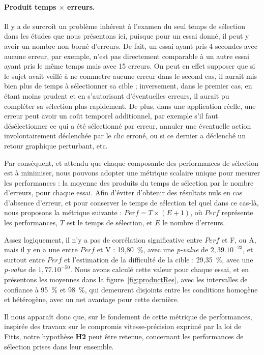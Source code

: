 	\paragraph{Produit temps $\times$ erreurs.}
	Il y a de surcroît un problème inhérent à l'examen du seul temps de sélection dans les études que nous présentons ici, puisque pour un essai donné, il peut y avoir un nombre non borné d'erreurs. De fait, un essai ayant pris 4 secondes avec aucune erreur, par exemple, n'est pas directement comparable à un autre essai ayant pris le même temps mais avec 15 erreurs. On peut en effet supposer que si le sujet avait veillé à ne commetre aucune erreur dans le second cas, il aurait mis bien plus de temps à sélectionner sa cible ; inversement, dans le premier cas, en étant moins prudent et en s'autorisant d'éventuelles erreurs, il aurait pu compléter sa sélection plus rapidement. De plus, dans une application réelle, une erreur peut avoir un \og coût \fg{} temporel additionnel, par exemple s'il faut désélectionner ce qui a été sélectionné par erreur, annuler une éventuelle action involontairement déclenchée par le clic erroné, ou si ce dernier a déclenché un retour graphique perturbant, etc.
	
	Par conséquent, et attendu que chaque composante des performances de sélection est à minimiser, nous pouvons adopter une métrique scalaire unique pour mesurer les performances : la moyenne des produits du temps de sélection par le nombre d'erreurs, pour chaque essai. Afin d'éviter d'obtenir des résultats nuls en cas d'absence d'erreur, et pour conserver le temps de sélection tel quel dans ce cas-là, nous proposons la métrique suivante : $Perf = T \times{} (E+1)$, où $Perf$ représente les performances, $T$ est le temps de sélection, et $E$ le nombre d'erreurs.
	
	Assez logiquement, il n'y a pas de corrélation significative entre $Perf$ et F, ou A, mais il y en a une entre $Perf$ et V : 19,80~\%{}, avec une \emph{p-value} de $2,39.10^{-23}$, et surtout entre $Perf$ et l'estimation de la difficulté de la cible : 29,35~\%{}, avec une \emph{p-value} de $1,77.10^{-50}$. Nous avons calculé cette valeur pour chaque essai, et en présentons les moyennes dans la figure~\ref{fig:productRes}, avec les intervalles de confiance à 95~\%{} et 98~\%{}, qui demeurent disjoints entre les conditions homogène et hétérogène, avec un net avantage pour cette dernière.
	
	Il nous apparaît donc que, sur le fondement de cette métrique de performances, inspirée des travaux sur le compromis vitesse-précision exprimé par la loi de Fitts, notre hypothèse \textbf{H2} peut être retenue, concernant les performances de sélection prises dans leur ensemble.
	
